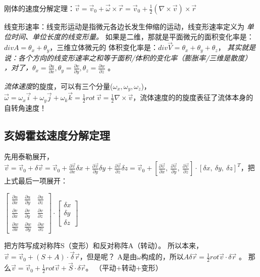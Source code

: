 \documentclass[UTF8,12pt]{article}
\begin{document}
刚体的速度分解定理：$\vec v = \vec v_0 + \vec \omega \times \vec r =\vec v_0 + \frac{1}{2}(\nabla \times \vec v ) \times \vec r$

线变形速率：线变形运动是指微元各边长发生伸缩的运动，线变形速率定义为\emph{
    单位时间、单位长度的线变形量。
}
如果是二维，那就是平面微元的面积变化率是：$div A = \theta _x + \theta_y$，三维立体微元的
体积变化率是：$div \vec V = \theta_x +\theta_y + \theta_z$，\emph{
    其实就是说：各个方向的线变形速率之和等于面积/体积的变化率（膨胀率/三维是散度）
    ，对了，$\theta_x = \frac{\partial u}{\partial x},
    \theta_y = \frac{\partial v}{\partial y},
    \theta_z = \frac{\partial w}{\partial z}$
}。

\emph{流体速度}的旋度，可以有三个分量($\omega_x,\omega_y,\omega_z$)，$\vec \omega = 
\omega_x \vec i + \omega _y \vec j + \omega _k \vec k = \frac{1}{2}rot~\vec v
= \frac{1}{2} \nabla \times \vec v
$，流体速度的的旋度表征了流体本身的自转角速度！

\subsection{亥姆霍兹速度分解定理}

先用泰勒展开，$\vec v = \vec v_0 + \delta \vec v
                    = \vec v_0 + \frac{\partial \vec v}{\partial x} \delta x
                    + \frac{\partial \vec v}{\partial y} \delta y
                    + \frac{\partial \vec v}{\partial z} \delta z
                    = \vec v_0 + [\frac{\partial \vec v}{\partial x},~
                    \frac{\partial \vec v}{\partial y},~
                    \frac{\partial \vec v}{\partial z}] \cdot
                    [\delta x,~\delta y,~\delta z]^T
$，把上式最后一项展开：

\begin{center}
$
\begin{bmatrix}

    \frac{\partial u}{\partial x} & \frac{\partial u}{\partial y} & \frac{\partial u}{\partial z} \\
    \frac{\partial v}{\partial x} & \frac{\partial v}{\partial y} & \frac{\partial v}{\partial z} \\
    \frac{\partial w}{\partial x} & \frac{\partial w}{\partial y} & \frac{\partial w}{\partial z}
\end{bmatrix}
\cdot
\begin{bmatrix}
    \delta x \\ \delta y \\ \delta z
\end{bmatrix}
$
\end{center}
把方阵写成对称阵S（变形）和反对称阵A（转动）。
所以本来，$\vec v = \vec v_0 + (S+A)\cdot \vec \delta \vec r$，但是呢？
A是由$\omega$构成的，所以$A \delta \vec r = \frac{1}{2} rot \vec v \cdot \delta \vec r$
。
那么$\vec v = \vec v_0  + \frac{1}{2} rot \vec v +\vec S \cdot \delta \vec r $。
（平动+转动+变形）
\end{document}
